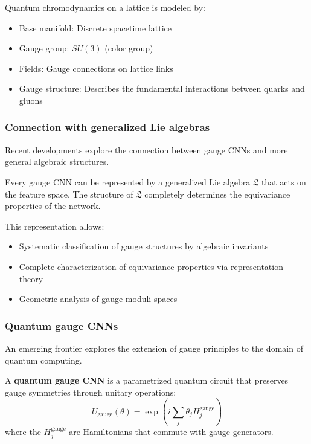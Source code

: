 \begin{example}
Quantum chromodynamics on a lattice is modeled by:
\begin{itemize}
\item Base manifold: Discrete spacetime lattice
\item Gauge group: $SU(3)$ (color group)
\item Fields: Gauge connections on lattice links
\item Gauge structure: Describes the fundamental interactions between quarks and gluons
\end{itemize}
\end{example}

\subsubsection{Connection with generalized Lie algebras}

Recent developments explore the connection between gauge CNNs and more general algebraic structures.

\begin{theorem}
Every gauge CNN can be represented by a generalized Lie algebra $\mathfrak{L}$ that acts on the feature space. The structure of $\mathfrak{L}$ completely determines the equivariance properties of the network.
\end{theorem}

This representation allows:
\begin{itemize}
\item Systematic classification of gauge structures by algebraic invariants
\item Complete characterization of equivariance properties via representation theory
\item Geometric analysis of gauge moduli spaces
\end{itemize}

\subsubsection{Quantum gauge CNNs}

An emerging frontier explores the extension of gauge principles to the domain of quantum computing.

\begin{definition}
A \textbf{quantum gauge CNN} is a parametrized quantum circuit that preserves gauge symmetries through unitary operations:
\begin{equation}
U_{\text{gauge}}(\theta) = \exp\left(i \sum_j \theta_j H_j^{\text{gauge}}\right)
\end{equation}
where the $H_j^{\text{gauge}}$ are Hamiltonians that commute with gauge generators.
\end{definition}

